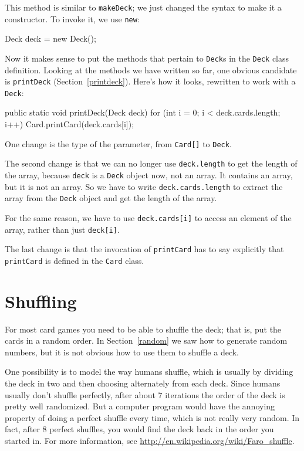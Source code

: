 This method is similar to {\tt makeDeck};
we just changed the syntax to make it a constructor.
To invoke it, we use {\tt new}:


\begin{code}
    Deck deck = new Deck();
\end{code}
%
Now it makes sense to put
the methods that pertain to {\tt Deck}s in the {\tt Deck}
class definition.  Looking at the methods we have written so
far, one obvious candidate is {\tt printDeck} (Section~\ref{printdeck}).
Here's how it looks, rewritten to work with a {\tt Deck}:

\begin{code}
    public static void printDeck(Deck deck) {
        for (int i = 0; i < deck.cards.length; i++) {
            Card.printCard(deck.cards[i]);
        }
    }
\end{code}
%
One change is the type of the parameter,
from {\tt Card[]} to {\tt Deck}.

The second change is that we can no
longer use {\tt deck.length} to get the length of the array, because
{\tt deck} is a {\tt Deck} object now, not an array.  It contains an
array, but it is not an array.  So we have to write
{\tt deck.cards.length} to extract the array from the {\tt Deck}
object and get the length of the array.

For the same reason, we have to use {\tt deck.cards[i]} to access an
element of the array, rather than just {\tt deck[i]}.

The last change
is that the invocation of {\tt printCard} has to say explicitly that
{\tt printCard} is defined in the {\tt Card} class.


\section{Shuffling}
\label{shuffle}

For most card games you need to be able to shuffle the deck;
that is, put the cards in a random order.  In Section~\ref{random}
we saw how to generate random numbers, but it is not obvious how
to use them to shuffle a deck.

One possibility is to model the way humans shuffle, which is usually
by dividing the deck in two and then choosing
alternately from each deck.  Since humans usually don't shuffle
perfectly, after about 7 iterations the order of the deck is pretty
well randomized.  But a computer program would have the annoying
property of doing a perfect shuffle every time, which is not really
very random.  In fact, after 8 perfect shuffles, you would find the
deck back in the order you started in.  For more information, see
\url{http://en.wikipedia.org/wiki/Faro_shuffle}.

